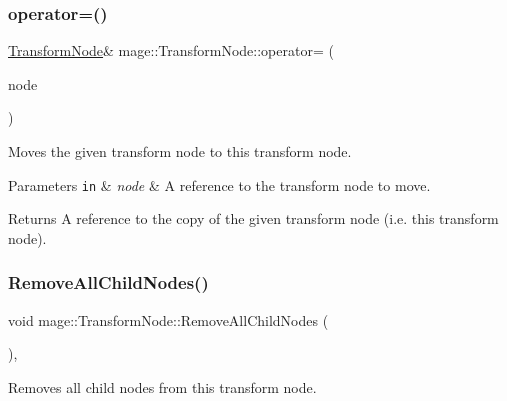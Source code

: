 \subsubsection{\texorpdfstring{operator=()}{operator=()}\hspace{0.1cm}{\footnotesize\ttfamily [2/2]}}
{\footnotesize\ttfamily \hyperlink{structmage_1_1_transform_node}{Transform\+Node}\& mage\+::\+Transform\+Node\+::operator= (\begin{DoxyParamCaption}\item[{\hyperlink{structmage_1_1_transform_node}{Transform\+Node} \&\&}]{node }\end{DoxyParamCaption})\hspace{0.3cm}{\ttfamily [delete]}}

Moves the given transform node to this transform node.


\begin{DoxyParams}[1]{Parameters}
\mbox{\tt in}  & {\em node} & A reference to the transform node to move. \\
\hline
\end{DoxyParams}
\begin{DoxyReturn}{Returns}
A reference to the copy of the given transform node (i.\+e. this transform node). 
\end{DoxyReturn}
\hypertarget{structmage_1_1_transform_node_aae7e3f918bcf38bd16db8475c7797c0b}{}\label{structmage_1_1_transform_node_aae7e3f918bcf38bd16db8475c7797c0b} 
\subsubsection{\texorpdfstring{Remove\+All\+Child\+Nodes()}{RemoveAllChildNodes()}}
{\footnotesize\ttfamily void mage\+::\+Transform\+Node\+::\+Remove\+All\+Child\+Nodes (\begin{DoxyParamCaption}{ }\end{DoxyParamCaption})\hspace{0.3cm}{\ttfamily [private]}, {\ttfamily [noexcept]}}

Removes all child nodes from this transform node. \hypertarget{structmage_1_1_transform_node_aef6e402c69bb125b09925b7a5ca79b33}{}\label{structmage_1_1_transform_node_aef6e402c69bb125b09925b7a5ca79b33} 
